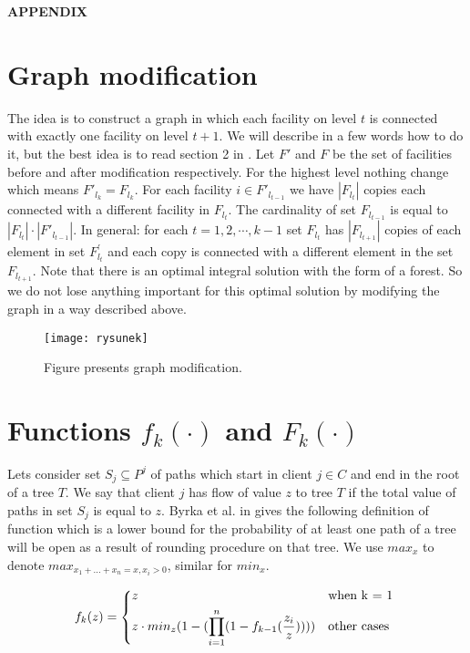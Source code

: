 \documentclass{llncs}
\begin{document}
\newpage
{\large \bf APPENDIX}
\begin{appendix}

\section{Graph modification} \label{sec:modiffication}
The idea is to construct a graph in which each facility on level $t$ is connected with exactly one facility on level $t+1$. We will describe in a few words how to do it, but the best idea is to read section 2 in \cite{Rybicki}. Let $F'$ and $F$ be the set of facilities before and after modification respectively. For the highest level nothing change which means $F'_{l_k} = F_{l_k}$. For each facility $i \in F'_{l_{t-1}}$ we have $|F_{l_t}|$ copies each connected with a different facility in $F_{l_t}$. The cardinality of set $F_{l_{t-1}}$ is equal to $|F_{l_t}|\cdot|F'_{l_{t-1}}|$. In general: for each $t = 1, 2, \cdots , k -1$ set $F_{l_t}$ has $|F_{l_{t+1}}|$ copies of each element in set $F^{'}_{l_t}$ and each copy is connected with a different element in the set $F_{l_{t+1}}$. Note that there is an optimal integral solution with the form of a forest. So we do not lose anything important for this optimal solution by modifying the graph in a way described above.

\begin{figure}
  \centering
  \texttt{[image: rysunek]}
  \caption{Figure presents graph modification.}
\end{figure}

\section{Functions $f_k(\cdot)$ and $F_k(\cdot)$}\label{sec:functions of probability}
Lets consider set $S_j \subseteq P^j$ of paths which start in client $j \in C$ and end in the root of a tree $T$. We say that client $j$ has flow of value $z$ to tree $T$ if the total value of paths in set $S_j$ is equal to $z$. Byrka et al. in \cite{Rybicki} gives the following definition of function which is a lower bound for the probability of at least one path of a tree will be open as a result of rounding procedure on that tree. We use $max_{x}$ to denote $max_{x_{1}+\ldots+x_{n} = x, x_i > 0}$, similar for $min_{x}$.

\[
f_{k}(z) =
   \begin{dcases*}
     z &  when  k = 1 \\
     z \cdot min_{z} (1 - (\prod_{i = 1}^{n}(1 - f_{k-1}(\frac{z_{i}}{z})))) & other cases


\end{dcases*}\]
\end{appendix}
\end{document}
